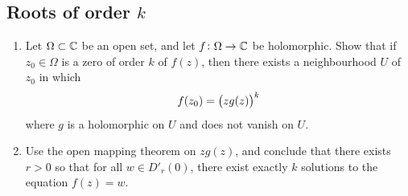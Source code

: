 \documentclass[11pt,a4paper]{article}
\begin{document}
\subsection{Roots of order \texorpdfstring{$k$}{k}}
\begin{exercise} \phantom{}
  \begin{enumerate}
    \item[(1)] Let $\Omega \subset \mathbb{C}$ be an open set,
      and let $f \colon \Omega \to \mathbb{C}$ be holomorphic.
      Show that if $z_0 \in \Omega$ is a zero of order $k$ of $f(z)$,
      then there exists a neighbourhood $U$ of $z_0$ in which
      \[
        f(z_0) = \del{z g(z)}^k
      \]
      where $g$ is a holomorphic on $U$ and does not vanish on $U$.
    \item[(2)] Use the open mapping theorem on $z g(z)$, and conclude that
      there exists $r > 0$ so that for all $w \in D'_r(0)$, there exist
      exactly $k$ solutions to the equation $f(z) = w$.
  \end{enumerate}
\end{exercise}
\end{document}
